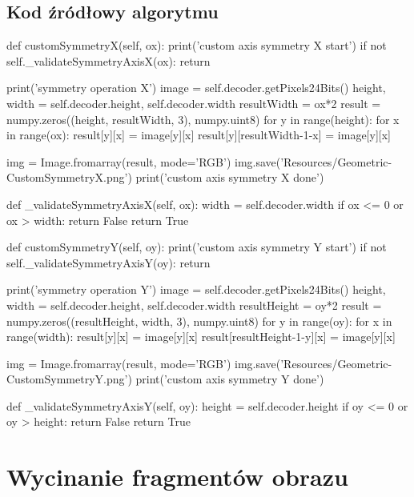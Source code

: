 \documentclass[a4paper,12pt]{book}
\begin{document}
\subsection*{Kod źródłowy algorytmu}
\begin{python}
def customSymmetryX(self, ox):
	print('custom axis symmetry X start')
	if not self._validateSymmetryAxisX(ox):
		return
	
	print('symmetry operation X')
	image = self.decoder.getPixels24Bits()
	height, width = self.decoder.height, self.decoder.width
	resultWidth = ox*2
	result = numpy.zeros((height, resultWidth, 3), numpy.uint8)
	for y in range(height):
		for x in range(ox):
			result[y][x] = image[y][x]
			result[y][resultWidth-1-x] = image[y][x]
	
	img = Image.fromarray(result, mode='RGB')
	img.save('Resources/Geometric-CustomSymmetryX.png')
	print('custom axis symmetry X done')
	
def _validateSymmetryAxisX(self, ox):
	width = self.decoder.width
	if ox <= 0 or ox > width:
		return False
	return True
	
def customSymmetryY(self, oy):
	print('custom axis symmetry Y start')
	if not self._validateSymmetryAxisY(oy):
	return
	
	print('symmetry operation Y')
	image = self.decoder.getPixels24Bits()
	height, width = self.decoder.height, self.decoder.width
	resultHeight = oy*2
	result = numpy.zeros((resultHeight, width, 3), numpy.uint8)
	for y in range(oy):
		for x in range(width):
			result[y][x] = image[y][x]
			result[resultHeight-1-y][x] = image[y][x]
	
	img = Image.fromarray(result, mode='RGB')
	img.save('Resources/Geometric-CustomSymmetryY.png')
	print('custom axis symmetry Y done')
	
def _validateSymmetryAxisY(self, oy):
	height = self.decoder.height
	if oy <= 0 or oy > height:
		return False
	return True
\end{python}
\section{Wycinanie fragmentów obrazu}
\end{document}
